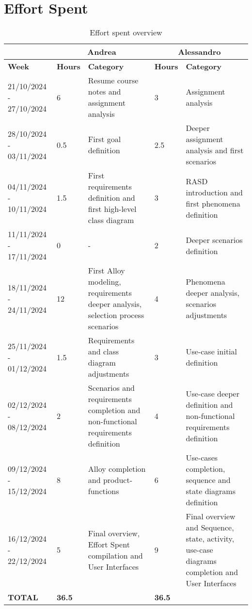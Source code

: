 \chapter{Effort Spent}
	\begin{center}
		\begin{table}[H]
			\begin{tabular}{ | m{3.2cm} | m{1cm}| m{4cm} | m{1.5cm}| m{4cm} | } 
				\hline
					&  \multicolumn{2}{c|}{ Andrea} & \multicolumn{2}{c|}{ Alessandro} \\ 
				\hline
					\textbf{Week} & \textbf{Hours}   & \textbf{Category} & \textbf{Hours}       & \textbf{Category} \\
				\hline
					21/10/2024 - 27/10/2024 & 6 & Resume course notes and assignment analysis & 3 & Assignment analysis\\
				\hline
					28/10/2024 - 03/11/2024 & 0.5 & First goal definition & 2.5 & Deeper assignment analysis and first scenarios \\
				\hline
					04/11/2024 - 10/11/2024 & 1.5 & First requirements definition and first high-level class diagram & 3 & RASD introduction and first phenomena definition\\
				\hline
					11/11/2024 - 17/11/2024 & 0 & - & 2 & Deeper scenarios definition \\
				\hline
					18/11/2024 - 24/11/2024 & 12 & First Alloy modeling, requirements deeper analysis, selection process scenarios & 4 & Phenomena deeper analysis, scenarios adjustments\\
				\hline
					25/11/2024 - 01/12/2024 & 1.5 & Requirements and class diagram adjustments & 3 & Use-case initial definition \\
				\hline
					02/12/2024 - 08/12/2024 & 2 & Scenarios and requirements completion and non-functional requirements definition & 4 & Use-case deeper definition and non-functional requirements definition\\
				\hline
					09/12/2024 - 15/12/2024 & 8 & Alloy completion and product-functions & 6 & Use-cases completion, sequence and state diagrams definition\\
				\hline
					16/12/2024 - 22/12/2024 & 5 & Final overview, Effort Spent compilation and User Interfaces & 9 & Final overview and Sequence, state, activity, use-case diagrams completion and User Interfaces\\
				\hline
					\textbf{TOTAL} & \textbf{36.5} & & \textbf{36.5} & \\
				\hline
			\end{tabular}
			\caption{Effort spent overview}
		\end{table}
	\end{center}